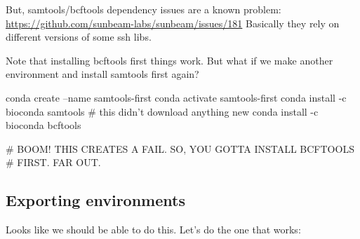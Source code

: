 \documentclass[]{krantz}
\makeatletter
\newenvironment{Shaded}{\begin{snugshade}}{\end{snugshade}}
\newcommand{\ExtensionTok}[1]{#1}
\newcommand{\NormalTok}[1]{#1}
\newcommand{\StringTok}[1]{\textcolor[rgb]{0.5,0.5,0.5}{#1}}
\newenvironment{kframe}{%
\medskip{}
\setlength{\fboxsep}{.8em}
 \def\at@end@of@kframe{}%
 \ifinner\ifhmode%
  \def\at@end@of@kframe{\end{minipage}}%
  \begin{minipage}{\columnwidth}%
 \fi\fi%
 \def\FrameCommand##1{\hskip\@totalleftmargin \hskip-\fboxsep
 \colorbox{shadecolor}{##1}\hskip-\fboxsep
     \hskip-\linewidth \hskip-\@totalleftmargin \hskip\columnwidth}%
 \MakeFramed {\advance\hsize-\width
   \@totalleftmargin\z@ \linewidth\hsize
   \@setminipage}}%
 {\par\unskip\endMakeFramed%
 \at@end@of@kframe}
\renewenvironment{Shaded}{\begin{kframe}}{\end{kframe}}
\makeatother
\begin{document}
But, samtools/bcftools dependency issues are a known problem: \url{https://github.com/sunbeam-labs/sunbeam/issues/181}
Basically they rely on different versions of some ssh libs.

Note that installing bcftools first things work. But what if we make another environment
and install samtools first again?

\begin{Shaded}
\begin{Highlighting}[]
\ExtensionTok{conda}\NormalTok{ create --name samtools-first}
\ExtensionTok{conda}\NormalTok{ activate samtools-first}
\ExtensionTok{conda}\NormalTok{ install -c bioconda samtools  # this didn}\StringTok{'t download anything new}
\StringTok{conda install -c bioconda bcftools}

\StringTok{# BOOM! THIS CREATES A FAIL.  SO, YOU GOTTA INSTALL BCFTOOLS}
\StringTok{# FIRST.  FAR OUT.}
\end{Highlighting}
\end{Shaded}

\hypertarget{exporting-environments}{%
\subsection{Exporting environments}\label{exporting-environments}}

Looks like we should be able to do this. Let's do the one that works:
\end{document}
